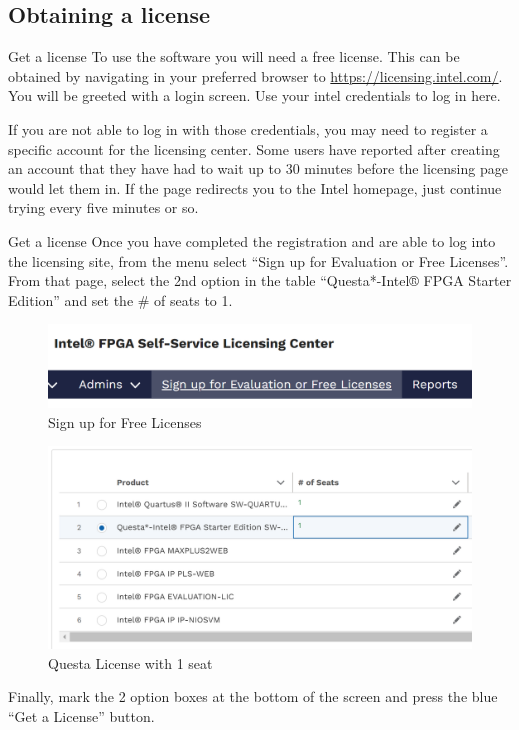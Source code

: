 \documentclass[fleqn]{beamer}
\newcommand{\quotes}[1]{``#1''}
\begin{document}
\subsection{Obtaining a license}
\begin{frame}{Get a license}
    To use the software you will need a free license. This can be obtained by navigating in your preferred browser to \url{https://licensing.intel.com/}. You will be greeted with a login screen. Use your intel credentials to log in here.\par
If you are not able to log in with those credentials, you may need to register a specific account for the licensing center. Some users have reported after creating an account that they have had to wait up to 30 minutes before the licensing page would let them in. If the page redirects you to the Intel homepage, just continue trying every five minutes or so.
\end{frame}
\begin{frame}{Get a license}
    Once you have completed the registration and are able to log into the licensing site, from the menu select \quotes{Sign up for Evaluation or Free Licenses}. From that page, select the 2nd option in the table \quotes{Questa*-Intel® FPGA Starter Edition} and set the \# of seats to 1.
    \begin{multicols}{2}
        \begin{figure}
            \centering
            \includegraphics[scale=.3]{figures/freelicenses.png}
            \caption{Sign up for Free Licenses}
            \label{fig:my_label}
        \end{figure}
        \begin{figure}
            \centering
            \includegraphics[scale=.3,trim={0 3cm 3cm 0},clip]{figures/questalicense.png}
            \caption{Questa License with 1 seat}
            \label{fig:my_label}
        \end{figure}
    \end{multicols}
    \vspace{-.5cm}
    Finally, mark the 2 option boxes at the bottom of the screen and press the blue \quotes{Get a License} button.
\end{frame}
\end{document}
